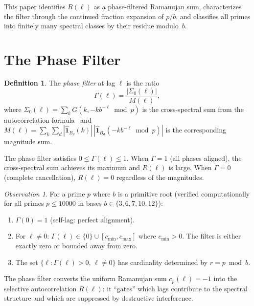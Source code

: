 \documentclass[12pt]{amsart}
\theoremstyle{definition}
\newtheorem{definition}[theorem]{Definition}
\theoremstyle{remark}
\newtheorem{observation}[theorem]{Observation}
\begin{document}
This paper identifies $R(\ell)$ as a phase-filtered Ramanujan sum,
characterizes the filter through the continued fraction expansion
of $p/b$, and classifies all primes into finitely many spectral
classes by their residue modulo~$b$.

\section{The Phase Filter}

\begin{definition}
The \emph{phase filter} at lag $\ell$ is the ratio
\[
\Gamma(\ell) = \frac{|\Sigma_0(\ell)|}{M(\ell)},
\]
where $\Sigma_0(\ell) = \sum_k G(k, -kb^{-\ell} \bmod p)$ is the
cross-spectral sum from the autocorrelation formula~\cite{paper9}
and
$M(\ell) = \sum_k \sum_d |\widehat{\mathbf{1}}_{B_d}(k)|\,
|\widehat{\mathbf{1}}_{B_d}(-kb^{-\ell} \bmod p)|$
is the corresponding magnitude sum.
\end{definition}

The phase filter satisfies $0 \le \Gamma(\ell) \le 1$. When
$\Gamma = 1$ (all phases aligned), the cross-spectral sum achieves
its maximum and $R(\ell)$ is large. When $\Gamma = 0$ (complete
cancellation), $R(\ell) = 0$ regardless of the magnitudes.

\begin{observation}\label{prop:filter-values}
For a prime $p$ where $b$ is a primitive root (verified
computationally for all primes $p \le 10000$ in bases
$b \in \{3, 6, 7, 10, 12\}$):
\begin{enumerate}
\item $\Gamma(0) = 1$ (self-lag: perfect alignment).
\item For $\ell \ne 0$: $\Gamma(\ell) \in \{0\} \cup
      [c_{\min}, c_{\max}]$ where $c_{\min} > 0$. The filter is
      either exactly zero or bounded away from zero.
\item The set $\{\ell : \Gamma(\ell) > 0, \, \ell \ne 0\}$ has
      cardinality determined by $r = p \bmod b$.
\end{enumerate}
\end{observation}

The phase filter converts the uniform Ramanujan sum $c_p(\ell) =
-1$ into the selective autocorrelation $R(\ell)$: it ``gates''
which lags contribute to the spectral structure and which are
suppressed by destructive interference.

\end{document}
